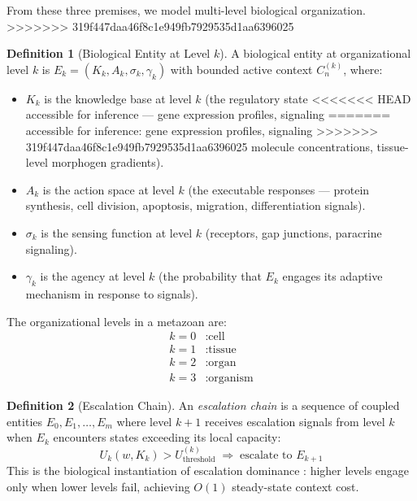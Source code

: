 \documentclass[11pt]{article}
\theoremstyle{definition}
\newtheorem{definition}{Definition}
\theoremstyle{remark}
\begin{document}
From these three premises, we model multi-level biological
organization.
>>>>>>> 319f447daa46f8c1e949fb7929535d1aa6396025

\begin{definition}[Biological Entity at Level $k$]
\label{def:bio-entity}
A biological entity at organizational level $k$ is
$E_k = (K_k, A_k, \sigma_k, \gamma_k)$ with bounded active context
$C_n^{(k)}$, where:
\begin{itemize}
\item $K_k$ is the knowledge base at level $k$ (the regulatory state
<<<<<<< HEAD
   accessible for inference --- gene expression profiles, signaling
=======
   accessible for inference: gene expression profiles, signaling
>>>>>>> 319f447daa46f8c1e949fb7929535d1aa6396025
   molecule concentrations, tissue-level morphogen gradients).
\item $A_k$ is the action space at level $k$ (the executable responses
   --- protein synthesis, cell division, apoptosis, migration,
   differentiation signals).
\item $\sigma_k$ is the sensing function at level $k$ (receptors,
   gap junctions, paracrine signaling).
\item $\gamma_k$ is the agency at level $k$ (the probability that
   $E_k$ engages its adaptive mechanism in response to signals).
\end{itemize}
The organizational levels in a metazoan are:
\begin{align*}
k = 0 &: \text{cell} \\
k = 1 &: \text{tissue} \\
k = 2 &: \text{organ} \\
k = 3 &: \text{organism}
\end{align*}
\end{definition}

\begin{definition}[Escalation Chain]
\label{def:chain}
An \emph{escalation chain} is a sequence of coupled entities
$E_0, E_1, \ldots, E_m$ where level $k+1$ receives escalation
signals from level $k$ when $E_k$ encounters states exceeding its
local capacity:
\[
U_k(w, K_k) > U_{\mathrm{threshold}}^{(k)}
\;\Rightarrow\;
\text{escalate to } E_{k+1}
\]
This is the biological instantiation of escalation dominance
\cite{McCarthy2026b}: higher levels engage only when lower levels
fail, achieving $O(1)$ steady-state context cost.
\end{definition}
\end{document}
